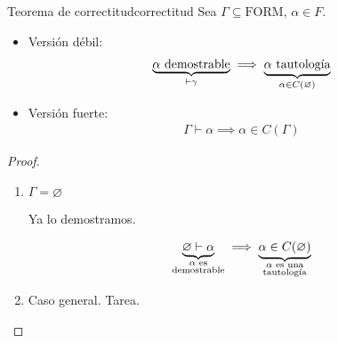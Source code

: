 \begin{teorema}{Teorema de correctitud}{correctitud}
    Sea $\Gamma \subseteq \mathrm{FORM}$, $\alpha \in F$.

    \medskip

    \begin{itemize}
        \item Versión débil:
            \begin{gather*}
                \underbrace{\alpha \text{ demostrable}}_{\vdash \gamma} 
                \implies 
                \underbrace{\alpha \text{ tautología}}_{%
                \alpha \in C(\varnothing)}
            \end{gather*}
        \item Versión fuerte:
            \begin{gather*}
                \Gamma \vdash \alpha \implies \alpha \in C(\Gamma)
            \end{gather*}
    \end{itemize}
\end{teorema}


\begin{proof} \phantom{.}

    \begin{enumerate}[%
                    labelindent=*,
                    style=multiline,
                    leftmargin=*,
                    align=left,
                    leftmargin=2\parindent,
                    label=Caso \arabic*)]
        \item $\Gamma = \varnothing$

            Ya lo demostramos.

            \begin{gather*}
                \underbrace{\varnothing \vdash \alpha}_{%
                \substack{\alpha \text{ es} \\ \text{demostrable}}} 
                \implies \underbrace{\alpha \in C(\varnothing)}_{%
                \substack{\alpha \text{ es una}\\\text{tautología}}}
            \end{gather*}
        
        \item Caso general. Tarea.
    \end{enumerate}
\end{proof}


